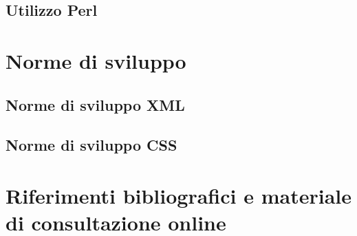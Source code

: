 \documentclass[10pt,a4paper,onecolumn]{article}
\begin{document}
\subsection{Utilizzo Perl}

\clearpage

\section{Norme di sviluppo}

\subsection{Norme di sviluppo XML}

\subsection{Norme di sviluppo CSS}

\clearpage

\section{Riferimenti bibliografici e materiale di consultazione online}
\end{document}
